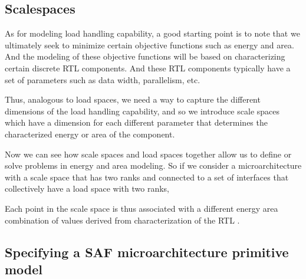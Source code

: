 \begin{itemize}
\subsection{Scalespaces}

As for modeling load handling capability, a good starting point is to note that we ultimately seek to minimize certain objective functions such as energy and area. And the modeling of these objective functions will be based on characterizing certain discrete RTL components. And these RTL components typically have a set of parameters such as data width, parallelism, etc.

Thus, analogous to load spaces, we need a way to capture the different dimensions of the load handling capability, and so we introduce scale spaces which have a dimension for each different parameter that determines the characterized energy or area of the component.

Now we can see how scale spaces and load spaces together allow us to define or solve problems in energy and area modeling. So if we consider a microarchitecture with a scale space that has two ranks and connected to a set of interfaces that collectively have a load space with two ranks,

Each point in the scale space is thus associated with a different energy area combination of values derived from characterization of the RTL .

\subsection{Specifying a SAF microarchitecture primitive model}


\end{itemize}
